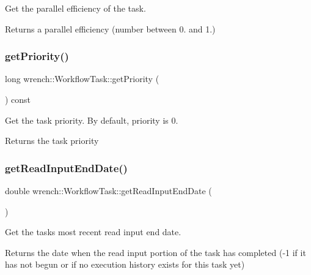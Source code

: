 Get the parallel efficiency of the task. 

\begin{DoxyReturn}{Returns}
a parallel efficiency (number between 0. and 1.) 
\end{DoxyReturn}
\mbox{\label{classwrench_1_1_workflow_task_a330d0b94f3958a6542ba8ce033448197}} 
\subsubsection{\texorpdfstring{get\+Priority()}{getPriority()}}
{\footnotesize\ttfamily long wrench\+::\+Workflow\+Task\+::get\+Priority (\begin{DoxyParamCaption}{ }\end{DoxyParamCaption}) const}



Get the task priority. By default, priority is 0. 

\begin{DoxyReturn}{Returns}
the task priority 
\end{DoxyReturn}
\mbox{\label{classwrench_1_1_workflow_task_a15bbd1fca442b459073164b52dcc44b0}} 
\subsubsection{\texorpdfstring{get\+Read\+Input\+End\+Date()}{getReadInputEndDate()}}
{\footnotesize\ttfamily double wrench\+::\+Workflow\+Task\+::get\+Read\+Input\+End\+Date (\begin{DoxyParamCaption}{ }\end{DoxyParamCaption})}



Get the task\textquotesingle{}s most recent read input end date. 

\begin{DoxyReturn}{Returns}
the date when the read input portion of the task has completed (-\/1 if it has not begun or if no execution history exists for this task yet) 
\end{DoxyReturn}
\mbox{\label{classwrench_1_1_workflow_task_a752f0e9cf1bcab72e41de185931dbf9a}} 
